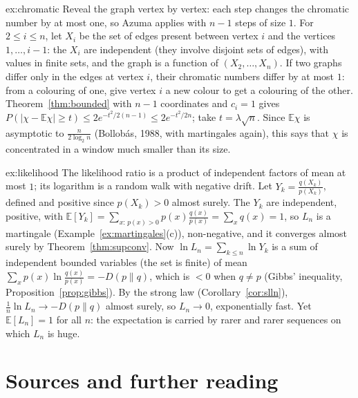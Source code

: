 \begin{solution}{ex:chromatic}
\idea Reveal the graph vertex by vertex: each step changes the chromatic number by at most one, so Azuma applies with
$n-1$ steps of size $1$.
\writeup For $2\le i\le n$, let $X_i$ be the set of edges present between vertex $i$ and the vertices $1,\dots,i-1$: the $X_i$ are independent (they involve
disjoint sets of edges), with values in finite sets, and the graph is a function of $(X_2,\dots,X_n)$. If two graphs differ only in the
edges at vertex $i$, their chromatic numbers differ by at most $1$: from a colouring of one, give vertex $i$ a new colour to get a
colouring of the other. Theorem~\ref{thm:bounded} with $n-1$ coordinates and $c_i=1$ gives $P(|\chi-\mathbb E\chi|\ge t)\le2e^{-t^2/2(n-1)}\le2e^{-t^2/2n}$; take $t=\lambda\sqrt n$.
Since $\mathbb E\chi$ is asymptotic to $\frac n{2\log_2n}$ (Bollob\'as, 1988, with martingales again), this says that $\chi$ is concentrated in a window much smaller than its size.
\end{solution}

\begin{solution}{ex:likelihood}
\idea The likelihood ratio is a product of independent factors of mean at most $1$; its logarithm is a random walk with
negative drift.
\writeup Let $Y_k=\frac{q(X_k)}{p(X_k)}$, defined and positive since $p(X_k)>0$ almost surely. The $Y_k$ are independent, positive, with
$\mathbb E[Y_k]=\sum_{x:\,p(x)>0}p(x)\frac{q(x)}{p(x)}=\sum_xq(x)=1$, so $L_n$ is a martingale (Example~\ref{ex:martingales}(c)), non-negative, and it converges almost
surely by Theorem~\ref{thm:supconv}. Now $\ln L_n=\sum_{k\le n}\ln Y_k$ is a sum of independent bounded variables (the set is finite) of mean
$\sum_xp(x)\ln\frac{q(x)}{p(x)}=-D(p\|q)$, which is $<0$ when $q\ne p$ (Gibbs' inequality, Proposition~\ref{prop:gibbs}). By the strong law (Corollary~\ref{cor:slln}),
$\frac1n\ln L_n\to-D(p\|q)$ almost surely, so $L_n\to0$, exponentially fast. Yet $\mathbb E[L_n]=1$ for all $n$: the expectation is carried by rarer and
rarer sequences on which $L_n$ is huge.
\end{solution}

\section*{Sources and further reading}

